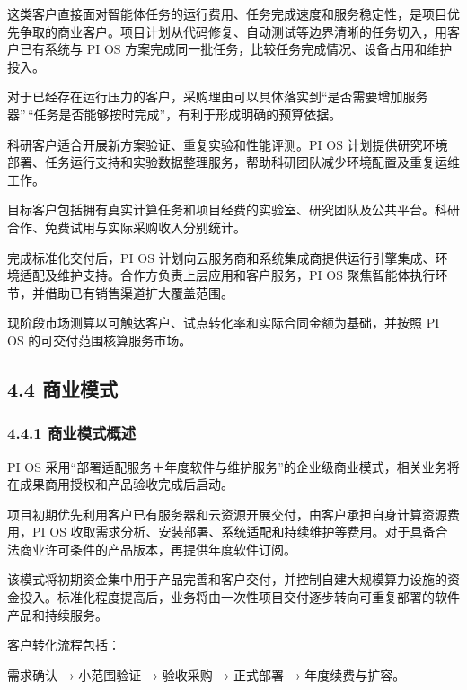 
这类客户直接面对智能体任务的运行费用、任务完成速度和服务稳定性，是项目优先争取的商业客户。项目计划从代码修复、自动测试等边界清晰的任务切入，用客户已有系统与 PI OS 方案完成同一批任务，比较任务完成情况、设备占用和维护投入。

对于已经存在运行压力的客户，采购理由可以具体落实到``是否需要增加服务器''\,``任务是否能够按时完成''，有利于形成明确的预算依据。


科研客户适合开展新方案验证、重复实验和性能评测。PI OS 计划提供研究环境部署、任务运行支持和实验数据整理服务，帮助科研团队减少环境配置及重复运维工作。

目标客户包括拥有真实计算任务和项目经费的实验室、研究团队及公共平台。科研合作、免费试用与实际采购收入分别统计。


完成标准化交付后，PI OS 计划向云服务商和系统集成商提供运行引擎集成、环境适配及维护支持。合作方负责上层应用和客户服务，PI OS 聚焦智能体执行环节，并借助已有销售渠道扩大覆盖范围。

现阶段市场测算以可触达客户、试点转化率和实际合同金额为基础，并按照 PI OS 的可交付范围核算服务市场。

\subsection{4.4 商业模式}\label{ux5546ux4e1aux6a21ux5f0f}

\subsubsection{4.4.1 商业模式概述}\label{ux5546ux4e1aux6a21ux5f0fux6982ux8ff0}

PI OS 采用``部署适配服务＋年度软件与维护服务''的企业级商业模式，相关业务将在成果商用授权和产品验收完成后启动。

项目初期优先利用客户已有服务器和云资源开展交付，由客户承担自身计算资源费用，PI OS 收取需求分析、安装部署、系统适配和持续维护等费用。对于具备合法商业许可条件的产品版本，再提供年度软件订阅。

该模式将初期资金集中用于产品完善和客户交付，并控制自建大规模算力设施的资金投入。标准化程度提高后，业务将由一次性项目交付逐步转向可重复部署的软件产品和持续服务。

客户转化流程包括：

需求确认 → 小范围验证 → 验收采购 → 正式部署 → 年度续费与扩容。

